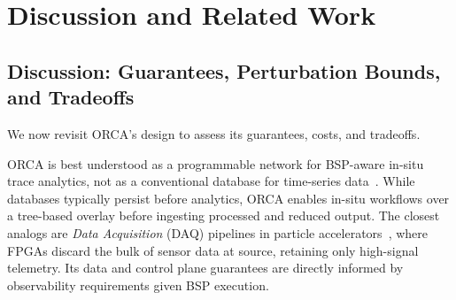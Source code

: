 

\section{Discussion and Related Work}\label{sec:orca:related}

\subsection{Discussion: Guarantees, Perturbation Bounds, and Tradeoffs}\label{sec:orca:design-discussion}


We now revisit ORCA's design to assess its guarantees, costs, and tradeoffs.



ORCA is best understood as a programmable network for BSP-aware in-situ trace analytics, not as
a conventional database for time-series data~\cite{:Prometheus,Agela2014:LDMS}.
While databases typically persist before analytics, ORCA enables in-situ workflows over a
tree-based overlay before ingesting processed and reduced output.
The closest analogs are \emph{Data Acquisition} (DAQ) pipelines in particle
accelerators~\cite{Aboli2016:DAQ-ATLAS,Bauer2012:DAQ-CMS}, where
FPGAs discard the bulk of sensor data at source, retaining only high-signal telemetry.
Its data and control plane guarantees are directly informed by observability requirements
given BSP execution.

